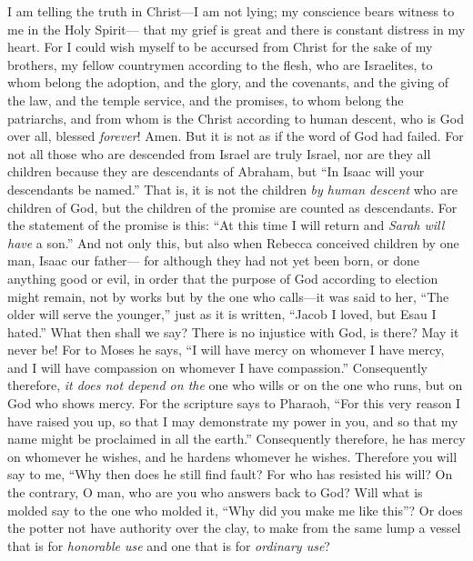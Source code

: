 \begin{biblechapter} %
 I am telling the truth in Christ—I am not lying; my conscience bears witness to me in the Holy Spirit—
\verse that my grief is great and there is constant distress in my heart.
\verse For I could wish myself to be accursed from Christ for the sake of my brothers, my fellow countrymen according to the flesh,
\verse who are Israelites, to whom belong the adoption, and the glory, and the covenants, and the giving of the law, and the temple service, and the promises,
\verse to whom belong the patriarchs, and from whom is the Christ according to human descent, who is God over all, blessed \textit{forever}! Amen.
\verse But it is not as if the word of God had failed. For not all those who are descended from Israel are truly Israel,
\verse nor are they all children because they are descendants of Abraham, but “In Isaac will your descendants be named.”
\verse That is, it is not the children \textit{by human descent} who are children of God, but the children of the promise are counted as descendants.
\verse For the statement of the promise is this: “At this time I will return and \textit{Sarah will have} a son.”
\verse And not only this, but also when Rebecca conceived children by one man, Isaac our father—
\verse for although they had not yet been born, or done anything good or evil, in order that the purpose of God according to election might remain,
\verse not by works but by the one who calls—it was said to her, “The older will serve the younger,”
\verse just as it is written, “Jacob I loved, but Esau I hated.”
 What then shall we say? There is no injustice with God, is there? May it never be!
\verse For to Moses he says, “I will have mercy on whomever I have mercy, and I will have compassion on whomever I have compassion.”
\verse Consequently therefore, \textit{it does not depend on the} one who wills or on the one who runs, but on God who shows mercy.
\verse For the scripture says to Pharaoh, “For this very reason I have raised you up, so that I may demonstrate my power in you, and so that my name might be proclaimed in all the earth.”
\verse Consequently therefore, he has mercy on whomever he wishes, and he hardens whomever he wishes.
\verse Therefore you will say to me, “Why then does he still find fault? For who has resisted his will?
\verse On the contrary, O man, who are you who answers back to God? Will what is molded say to the one who molded it, “Why did you make me like this”?
\verse Or does the potter not have authority over the clay, to make from the same lump a vessel that is for \textit{honorable use} and one that is for \textit{ordinary use}?

\end{biblechapter}
